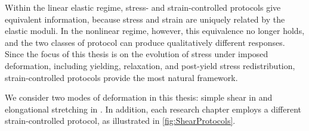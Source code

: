 Within the linear elastic regime, stress- and strain-controlled protocols give equivalent information, because stress and strain are uniquely related by the elastic moduli. In the nonlinear regime, however, this equivalence no longer holds, and the two classes of protocol can produce qualitatively different responses. Since the focus of this thesis is on the evolution of stress under imposed deformation, including yielding, relaxation, and post-yield stress redistribution, strain-controlled protocols provide the most natural framework.

We consider two modes of deformation in this thesis: simple shear in  and elongational stretching in . In addition, each research chapter employs a different strain-controlled protocol, as illustrated in \cref{fig:ShearProtocols}.




